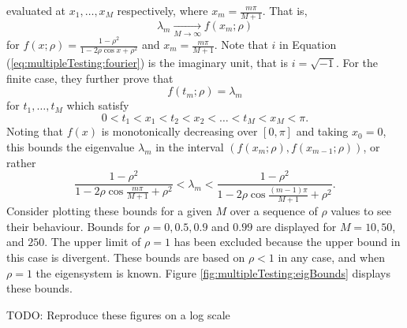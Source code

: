 \documentclass[letterpaper,12pt,oneside,final]{article}
\newcommand{\TODO}[1]{{\color{brickred} TODO:  {#1}}}
\begin{document}
evaluated at $x_1, \dots, x_M$ respectively, where $x_m = \frac{m \pi}{M+1}$. That is,
\begin{equation} \label{eq:multipleTesting:eigLim}
\lambda_m \xrightarrow[M \to \infty]{} f(x_m; \rho)
\end{equation}
for $f(x; \rho) = \frac{1 - \rho^2}{1 - 2\rho \cos x + \rho^2}$ and $x_{m} = \frac{m \pi}{M+1}$. Note that $i$ in Equation (\ref{eq:multipleTesting:fourier}) is the imaginary unit, that is $i = \sqrt{-1}$. For the finite case, they further prove that
\begin{equation} \label{eq:multipleTesting:orderEigen}
f(t_m; \rho) = \lambda_m
\end{equation}
for $t_1, \dots, t_M$ which satisfy
$$0 < t_1 < x_1 < t_2 < x_2 < \dots < t_M < x_M < \pi.$$
Noting that $f(x)$ is monotonically decreasing over $[0,\pi]$ and taking $x_0 = 0$, this bounds the eigenvalue $\lambda_m$ in the interval $(f(x_{m}; \rho), f(x_{m-1}; \rho))$, or rather
\begin{equation} \label{eq:multipleTesting:eigenBounds}
\frac{1 - \rho^2}{1 - 2\rho \cos \frac{m\pi}{M+1} + \rho^2} < \lambda_m < \frac{1 - \rho^2}{1 - 2\rho \cos \frac{(m-1)\pi}{M+1} + \rho^2}.
\end{equation}
Consider plotting these bounds for a given $M$ over a sequence of $\rho$ values to see their behaviour. Bounds for $\rho = 0, 0.5, 0.9$ and $0.99$ are displayed for $M = 10, 50$, and $250$. The upper limit of $\rho=1$ has been excluded because the upper bound in this case is divergent. These bounds are based on $\rho < 1$ in any case, and when $\rho = 1$ the eigensystem is known. Figure \ref{fig:multipleTesting:eigBounds} displays these bounds.

\TODO{Reproduce these figures on a log scale}
\end{document}
